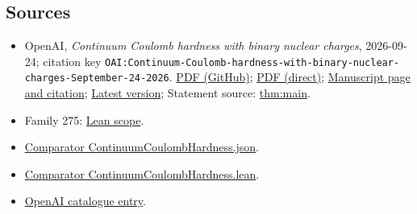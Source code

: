 \documentclass[11pt]{article}
\begin{document}
\subsection{Sources}
\begin{itemize}
\item OpenAI, \emph{Continuum Coulomb hardness with binary nuclear charges}, 2026-09-24; citation key \texttt{OAI:Continuum-Coulomb-hardness-with-binary-nuclear-charges-September-24-2026}. \href{https://github.com/openai/math/blob/adc7f1241b42e322a6451854ab7e4b4c146bf78a/preprints/Continuum-Coulomb-hardness-with-binary-nuclear-charges-September-24-2026/Continuum-Coulomb-hardness-with-binary-nuclear-charges-September-24-2026.pdf}{PDF (GitHub)}; \href{https://github.com/openai/math/raw/adc7f1241b42e322a6451854ab7e4b4c146bf78a/preprints/Continuum-Coulomb-hardness-with-binary-nuclear-charges-September-24-2026/Continuum-Coulomb-hardness-with-binary-nuclear-charges-September-24-2026.pdf}{PDF (direct)}; \href{https://github.com/openai/math/blob/adc7f1241b42e322a6451854ab7e4b4c146bf78a/preprints/Continuum-Coulomb-hardness-with-binary-nuclear-charges-September-24-2026/README.md}{Manuscript page and citation}; \href{https://github.com/openai/math/blob/main/preprints/Continuum-Coulomb-hardness-with-binary-nuclear-charges-September-24-2026/Continuum-Coulomb-hardness-with-binary-nuclear-charges-September-24-2026.pdf}{Latest version}; Statement source: \href{https://github.com/openai/math/blob/adc7f1241b42e322a6451854ab7e4b4c146bf78a/preprints/Continuum-Coulomb-hardness-with-binary-nuclear-charges-September-24-2026/build/sections/00-introduction.tex\#L51}{thm:main}.
\item Family 275: \href{https://github.com/openai/math/blob/adc7f1241b42e322a6451854ab7e4b4c146bf78a/lean/docs/275.md}{Lean scope}.
\item \href{https://github.com/openai/math/blob/adc7f1241b42e322a6451854ab7e4b4c146bf78a/lean/ComparatorChallenges/ContinuumCoulombHardness.json}{Comparator ContinuumCoulombHardness.json}.
\item \href{https://github.com/openai/math/blob/adc7f1241b42e322a6451854ab7e4b4c146bf78a/lean/ComparatorChallenges/ContinuumCoulombHardness.lean}{Comparator ContinuumCoulombHardness.lean}.
\item \href{https://github.com/openai/math/blob/adc7f1241b42e322a6451854ab7e4b4c146bf78a/CONTENTS.md}{OpenAI catalogue entry}.
\end{itemize}
\end{document}
